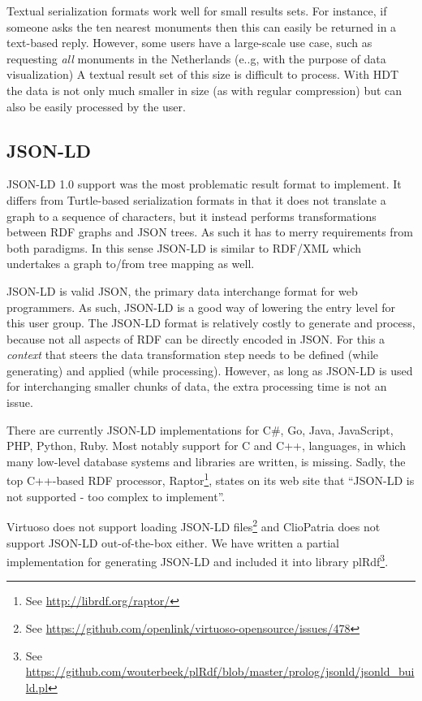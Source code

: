 \documentclass[a4paper]{scrartcl}
\newcommand{\seeUrl}[1]{\footnote{See \mbox{\url{#1}}}}
\begin{document}
Textual serialization formats work well for small results sets.  For
instance, if someone asks the ten nearest monuments then this can
easily be returned in a text-based reply.  However, some users have a
large-scale use case, such as requesting \emph{all} monuments in the
Netherlands (e..g, with the purpose of data visualization) A textual
result set of this size is difficult to process.  With HDT the data is
not only much smaller in size (as with regular compression) but can
also be easily processed by the user.


\subsection{JSON-LD}
\label{sec:jsonld}

JSON-LD 1.0 support was the most problematic result format to
implement.  It differs from Turtle-based serialization formats in that
it does not translate a graph to a sequence of characters, but it
instead performs transformations between RDF graphs and JSON trees.
As such it has to merry requirements from both paradigms.  In this
sense JSON-LD is similar to RDF/XML which undertakes a graph to/from
tree mapping as well.

JSON-LD is valid JSON, the primary data interchange format for web
programmers.  As such, JSON-LD is a good way of lowering the entry
level for this user group.  The JSON-LD format is relatively costly to
generate and process, because not all aspects of RDF can be directly
encoded in JSON.  For this a \emph{context} that steers the data
transformation step needs to be defined (while generating) and applied
(while processing).  However, as long as JSON-LD is used for
interchanging smaller chunks of data, the extra processing time is not
an issue.

There are currently JSON-LD implementations for C\#, Go, Java,
JavaScript, PHP, Python, Ruby.  Most notably support for C and C++,
languages, in which many low-level database systems and libraries are
written, is missing.  Sadly, the top C++-based RDF processor,
Raptor\seeUrl{http://librdf.org/raptor/}, states on its web site that
``JSON-LD is not supported - too complex to implement''.

Virtuoso does not support loading JSON-LD
files\seeUrl{https://github.com/openlink/virtuoso-opensource/issues/478}
and ClioPatria does not support JSON-LD out-of-the-box either.  We
have written a partial implementation for generating JSON-LD and
included it into library plRdf\seeUrl{https://github.com/wouterbeek/plRdf/blob/master/prolog/jsonld/jsonld_build.pl}.
\end{document}
